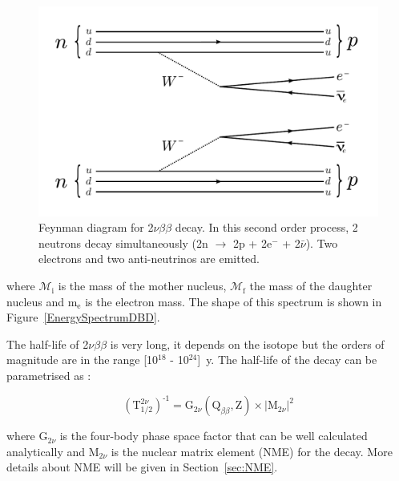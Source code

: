 \documentclass[main.tex]{subfiles}
\begin{document}
\begin{figure}[h!]
\begin{center}
\includegraphics[scale=0.5]{pictures/Chap2/2nubbFeynmanDiagram_v3.pdf}
\caption{Feynman diagram for 2$\nu\beta\beta$ decay. In this second order process, 2 neutrons decay simultaneously (2n $\rightarrow$ 2p + 2e$^-$ + 2$\bar{\nu}$). Two electrons and two anti-neutrinos are emitted.}
\label{2nubbFeynman}
\end{center}
\end{figure}


\bigskip


\NI 


\bigskip


\NI where $\mathcal{M}_\text{i}$ is the mass of the mother nucleus, $\mathcal{M}_\text{f}$ the mass of the daughter nucleus and m$_\text{e}$ is the electron mass. The shape of this spectrum is shown in Figure~\ref{EnergySpectrumDBD}.


\bigskip


\NI The half-life of 2$\nu\beta\beta$ is very long, it depends on the isotope but the orders of magnitude are in the range [10$^{\text{18}}$ - 10$^{\text{24}}$]~y.  The half-life of the decay can be parametrised as : 


\begin{equation}\label{eq:decayRate2nu}
(\text{T}_{\text{1/2}}^{\text{2}\nu})^{\text{-1}} = \text{G}_{\text{2}\nu}(\text{Q}_{\beta\beta}, \text{Z}) \times |\text{M}_{\text{2}\nu}|^\text{2}
\end{equation}


\bigskip


\NI where G$_{\text{2}\nu}$ is the four-body phase space factor that can be well calculated analytically and M$_{\text{2}\nu}$ is the nuclear matrix element (NME) for the decay. More details about NME will be given in Section~\ref{sec:NME}.
\end{document}
